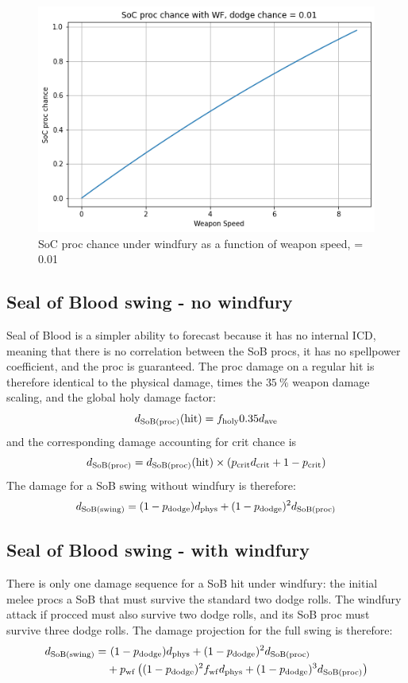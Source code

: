 \begin{figure}[ht] 
	\centering \includegraphics[width=0.84\columnwidth]{figs/wf_soc_1.png}
	\caption{SoC proc chance under windfury as a function of weapon speed, \pdodge = 0.01}
	\label{fig:soc_wf}
\end{figure}

\newpage
\subsection{Seal of Blood swing - no windfury}
Seal of Blood is a simpler ability to forecast because it has no internal ICD, meaning that there is no correlation between the SoB procs, it has no spellpower coefficient, and the proc is guaranteed.
The proc damage on a regular hit is therefore identical to the physical damage, times the $35~\%$ weapon damage scaling, and the global holy damage factor:
\begin{equation}
		d_\mathrm{SoB(proc)} (\mathrm{hit}) = f_{\mathrm{holy}}  0.35  d_{\mathrm{ave}} 
\end{equation}
and the corresponding damage accounting for crit chance is
\begin{equation}
	d_\mathrm{SoB(proc)}  = d_\mathrm{SoB(proc)} (\mathrm{hit}) \times (p_{\mathrm{crit}}  d_{\mathrm{crit}}  + 1 - p_{\mathrm{crit}} )
\end{equation}
The damage for a SoB swing without windfury is therefore:
\begin{equation}
	d_\mathrm{SoB(swing)}  = (1 - p_{\mathrm{dodge}} ) d_{\mathrm{phys}}  + (1-p_{\mathrm{dodge}} )^2 d_\mathrm{SoB(proc)} 
\end{equation}

\subsection{Seal of Blood swing - with windfury}
There is only one damage sequence for a SoB hit under windfury: the initial melee procs a SoB that must survive the standard two dodge rolls.
The windfury attack if procced must also survive two dodge rolls, and its SoB proc must survive three dodge rolls.
The damage projection for the full swing is therefore:
\begin{equation*}
	\begin{aligned}
		d_\mathrm{SoB(swing)}  =&~ (1 - p_{\mathrm{dodge}} ) d_{\mathrm{phys}}  + (1-p_{\mathrm{dodge}} )^2 d_\mathrm{SoB(proc)}  \\
		&+ p_{\mathrm{wf}}  \left( (1-p_{\mathrm{dodge}} )^2 f_{\mathrm{wf}}  d_{\mathrm{phys}}  + (1-p_{\mathrm{dodge}} )^3 d_\mathrm{SoB(proc)}  \right)
	\end{aligned}
\end{equation*}


